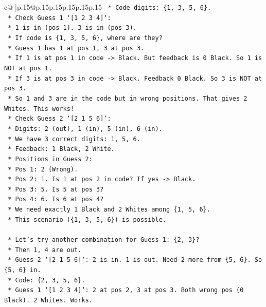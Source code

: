 \documentclass{article}
\begin{document}
{\begin{supertabular}{c@{$\;$}|p{.15\linewidth}@{}p{.15\linewidth}p{.15\linewidth}p{.15\linewidth}p{.15\linewidth}p{.15\linewidth}}
{{{\texttt{        *   Code digits: \{1, 3, 5, 6\}.} \\
\texttt{        *   Check Guess 1 `{[}1 2 3 4{]}`:} \\
\texttt{            *   1 is in (pos 1). 3 is in (pos 3).} \\
\texttt{            *   If code is \{1, 3, 5, 6\}, where are they?} \\
\texttt{            *   Guess 1 has 1 at pos 1, 3 at pos 3.} \\
\texttt{            *   If 1 is at pos 1 in code {-}> Black. But feedback is 0 Black. So 1 is NOT at pos 1.} \\
\texttt{            *   If 3 is at pos 3 in code {-}> Black. Feedback 0 Black. So 3 is NOT at pos 3.} \\
\texttt{            *   So 1 and 3 are in the code but in wrong positions. That gives 2 Whites. This works!} \\
\texttt{        *   Check Guess 2 `{[}2 1 5 6{]}`:} \\
\texttt{            *   Digits: 2 (out), 1 (in), 5 (in), 6 (in).} \\
\texttt{            *   We have 3 correct digits: 1, 5, 6.} \\
\texttt{            *   Feedback: 1 Black, 2 White.} \\
\texttt{            *   Positions in Guess 2:} \\
\texttt{                *   Pos 1: 2 (Wrong).} \\
\texttt{                *   Pos 2: 1. Is 1 at pos 2 in code? If yes {-}> Black.} \\
\texttt{                *   Pos 3: 5. Is 5 at pos 3?} \\
\texttt{                *   Pos 4: 6. Is 6 at pos 4?} \\
\texttt{            *   We need exactly 1 Black and 2 Whites among \{1, 5, 6\}.} \\
\texttt{            *   This scenario (\{1, 3, 5, 6\}) is possible.} \\
\\ 
\texttt{    *   Let's try another combination for Guess 1: \{2, 3\}?} \\
\texttt{        *   Then 1, 4 are out.} \\
\texttt{        *   Guess 2 `{[}2 1 5 6{]}`: 2 is in. 1 is out. Need 2 more from \{5, 6\}. So \{5, 6\} in.} \\
\texttt{        *   Code: \{2, 3, 5, 6\}.} \\
\texttt{        *   Guess 1 `{[}1 2 3 4{]}`: 2 at pos 2, 3 at pos 3. Both wrong pos (0 Black). 2 Whites. Works.} \\
}}}
\end{supertabular}}
\end{document}
